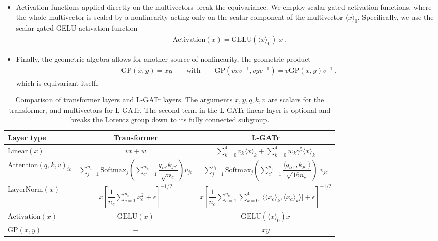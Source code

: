 \documentclass[submission, Phys]{SciPost}
\begin{document}
\begin{itemize}
\item Activation functions applied directly on the multivectors break the equivariance. We employ scalar-gated activation functions, where the whole multivector is scaled by a nonlinearity acting only on the scalar component of the multivector $\langle x\rangle_0$. Specifically, we use the scalar-gated GELU activation function
%
\begin{align}
    \text{Activation}(x) = \text{GELU}(\langle x\rangle_0 ) \; x \; .
\end{align}

\item Finally, the geometric algebra allows for another source of nonlinearity, the geometric product
%
\begin{align}
    \text{GP}(x,y) = xy
    \qquad \text{with} \qquad 
    \text{GP}(vxv^{-1}, vyv^{-1}) = v\text{GP}(x,y)v^{-1} \; ,
\end{align}
%
which is equivariant itself. 
\end{itemize}

\begin{table}[t]
    \centering
    \begin{small} \begin{tabular}{l c c}
        \toprule
        Layer type & Transformer & L-GATr \\[1mm]
        \midrule
        $\text{Linear}(x)$ & $v x + w$ & $\sum_{k=0}^4 v_k\langle x\rangle_k + \sum_{k=0}^4 w_k \gamma^5 \langle x\rangle_k$ \\[2mm]
        $\text{Attention}(q,k,v)_{ic}$ & $\sum_{j=1}^{n_t} \text{Softmax}_j\left(\sum_{c'=1}^{n_c}\dfrac{q_{ic'}k_{jc'}}{\sqrt{n_c}}\right) v_{jc}$ & $\sum_{j=1}^{n_t} \text{Softmax}_j \left( \sum_{c'=1}^{n_c}\dfrac {\langle q_{ic'}, k_{jc'}\rangle} {\sqrt{16n_c}} \right) \; v_{jc}$ \\[4mm]
        $\text{LayerNorm}(x)$ & $x \left[ \dfrac{1}{n_c}\sum_{c=1}^{n_c} x_c^2 + \epsilon \right]^{-1/2}$ &  $x\left[ \dfrac{1}{n_c} \sum_{c=1}^{n_c} \sum_{k=0}^4 \Big\rvert \Big\langle \langle x_c \rangle_k, \langle x_c\rangle_k \Big\rangle \Big\rvert + \epsilon \right]^{-1/2}$ \\[4mm]
        $\text{Activation}(x)$ & $\text{GELU}(x)$ & $\text{GELU}(\langle x\rangle_0) x$ \\[2mm]
        $\text{GP}(x, y)$ & $-$ & $xy$ \\
        \bottomrule
    \end{tabular} \end{small}
    \caption{Comparison of transformer layers and L-GATr layers. The arguments $x, y, q, k, v$ are scalars for the transformer, and multivectors for L-GATr. The second term in the L-GATr linear layer is optional and breaks the Lorentz group down to its fully connected subgroup.} 
    \label{tab:layers}
\end{table}
\end{document}
